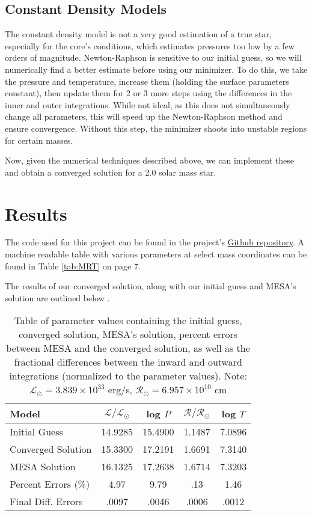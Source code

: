 \documentclass[twocolumn]{aastex631}
\begin{document}
\subsection{Constant Density Models}

The constant density model is not a very good estimation of a true star, especially for the core's conditions, which estimates pressures too low by a few orders of magnitude. Newton-Raphson is sensitive to our initial guess, so we will numerically find a better estimate before using our minimizer. To do this, we take the pressure and temperature, increase them (holding the surface parameters constant), then update them for 2 or 3 more steps using the differences in the inner and outer integrations. While not ideal, as this does not simultaneously change all parameters, this will speed up the Newton-Raphson method and ensure convergence. Without this step, the minimizer shoots into unstable regions for certain masses.

Now, given the numerical techniques described above, we can implement these and obtain a converged solution for a 2.0 solar mass star.

\section{Results}

The code used for this project can be found in the project's \href{https://github.com/pmccreery/ZAMS-code}{Github repository}. A machine readable table with various parameters at select mass coordinates can be found in Table \ref{tab:MRT} on page 7.

The results of our converged solution, along with our initial guess and MESA's solution are outlined below \citep{mesa}.
\begin{table}[ht!]
\centering
\begin{tabular}{ | l | c | c | c | c | }
\hline
Model & $\mathcal{L}/\mathcal{L}_\odot$ & log $P$ & $\mathcal{R}/\mathcal{R}_\odot$ & log $T$ \\
\hline
Initial Guess & 14.9285 & 15.4900 & 1.1487 & 7.0896 \\
\hline
Converged Solution & 15.3300 & 17.2191 & 1.6691 & 7.3140 \\
\hline
MESA Solution & 16.1325 & 17.2638 & 1.6714 & 7.3203 \\
\hline
Percent Errors (\%) & 4.97 & 9.79 & .13 & 1.46 \\
\hline
Final Diff. Errors & .0097 & .0046 & .0006 & .0012 \\
\hline
\end{tabular}
\caption{Table of parameter values containing the initial guess, converged solution, MESA's solution, percent errors between MESA and the converged solution, as well as the fractional differences between the inward and outward integrations (normalized to the parameter values). Note: $\mathcal{L}_\odot = 3.839\times 10^{33} $ erg/s, $\mathcal{R}_\odot = 6.957\times 10^{10} $ cm}
\label{tab:res}
\end{table}
\end{document}
